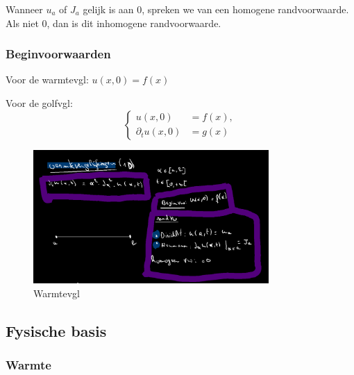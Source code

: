 \documentclass[a4paper]{report}
\begin{document}
Wanneer $u_a$ of $J_a$ gelijk is aan 0, spreken we van een homogene randvoorwaarde.
Als niet 0, dan is dit inhomogene randvoorwaarde.

\subsubsection{Beginvoorwaarden}

Voor de warmtevgl: $u(x, 0) = f(x)$

Voor de golfvgl:
\[
	\left\{
	\begin{aligned}
		u(x, 0)            & = f(x), \\
		\partial_t u(x, 0) & = g(x)
	\end{aligned}
	\right.
\]

\begin{figure}[H]
	\centering
	\includegraphics[width=0.8\textwidth]{assets/warmtevgl.png}
	\caption{Warmtevgl}
	\label{fig:warmtevgl}
\end{figure}

\subsection{Fysische basis}

\subsubsection{Warmte}
\end{document}
